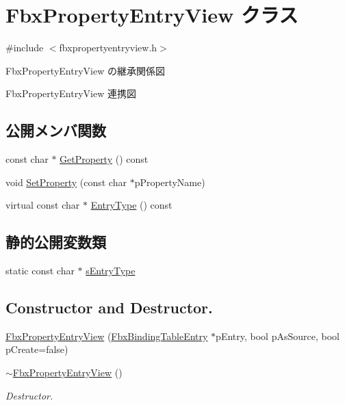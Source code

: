 \hypertarget{class_fbx_property_entry_view}{}\section{Fbx\+Property\+Entry\+View クラス}
\label{class_fbx_property_entry_view}


{\ttfamily \#include $<$fbxpropertyentryview.\+h$>$}



Fbx\+Property\+Entry\+View の継承関係図


Fbx\+Property\+Entry\+View 連携図
\subsection*{公開メンバ関数}
\begin{DoxyCompactItemize}
\item 
const char $\ast$ \hyperlink{class_fbx_property_entry_view_a22f4b61845256d48885dc873c7341edc}{Get\+Property} () const
\item 
void \hyperlink{class_fbx_property_entry_view_adcf0a92938e634f1bcedaaf31281de61}{Set\+Property} (const char $\ast$p\+Property\+Name)
\item 
virtual const char $\ast$ \hyperlink{class_fbx_property_entry_view_a36affcd0bce8be2a4b5f94ccd60fa462}{Entry\+Type} () const
\end{DoxyCompactItemize}
\subsection*{静的公開変数類}
\begin{DoxyCompactItemize}
\item 
static const char $\ast$ \hyperlink{class_fbx_property_entry_view_a862b7d0e633c2cb246b5b63a48ffd706}{s\+Entry\+Type}
\end{DoxyCompactItemize}
\subsection*{Constructor and Destructor.}
\begin{DoxyCompactItemize}
\item 
\hyperlink{class_fbx_property_entry_view_ac1d9bbc86521ef0f3d8a1761568bc19c}{Fbx\+Property\+Entry\+View} (\hyperlink{class_fbx_binding_table_entry}{Fbx\+Binding\+Table\+Entry} $\ast$p\+Entry, bool p\+As\+Source, bool p\+Create=false)
\item 
\hyperlink{class_fbx_property_entry_view_a9c6c4f93cb0a12ba2f2251e773892a56}{$\sim$\+Fbx\+Property\+Entry\+View} ()
\begin{DoxyCompactList}\small\item\em Destructor. \end{DoxyCompactList}\end{DoxyCompactItemize}
